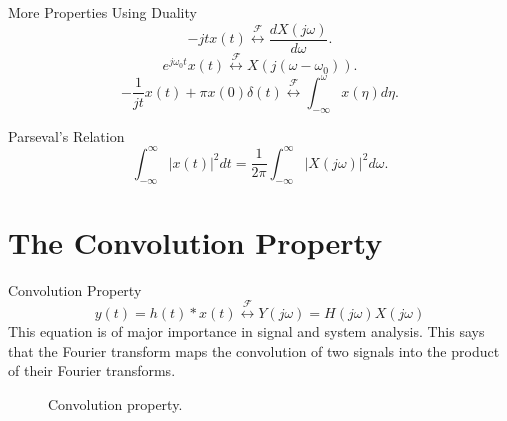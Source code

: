 \begin{frame}{More Properties Using Duality}
    \begin{equation*}
        -jtx(t) \overset{\mathcal{F}}{\longleftrightarrow} \frac{dX(j\omega)}{d\omega}.
    \end{equation*}
    \begin{equation*}
        e^{j\omega_0 t}x(t) \overset{\mathcal{F}}{\longleftrightarrow} X(j(\omega - \omega_0)).
    \end{equation*}
    \begin{equation*}
        -\frac{1}{jt}x(t) + \pi x(0) \delta(t) \overset{\mathcal{F}}{\longleftrightarrow} \int_{-\infty}^{\omega}x(\eta)d\eta.
    \end{equation*}
\end{frame}

\begin{frame}{Parseval's Relation}
    \begin{equation*}
        \int_{-\infty}^{\infty} |x(t)|^2dt = \frac{1}{2\pi} \int_{-\infty}^{\infty} |X(j\omega)|^2d\omega.
    \end{equation*}

\end{frame}


\section{The Convolution Property}

\begin{frame}{Convolution Property}
    \begin{equation*}
        y(t) = h(t)\ast x(t) \overset{\mathcal{F}}{\longleftrightarrow} Y(j\omega) =  H(j\omega)  X(j\omega)
    \end{equation*}
    This equation is of major importance in signal and system analysis. This says that the Fourier transform maps the convolution of two signals into the product of their Fourier transforms.
\end{frame}



\begin{frame}
    \begin{figure}
      \centering
      
      \caption{Convolution property.}\label{fi:conv_prop}
    \end{figure}
    
\end{frame}


